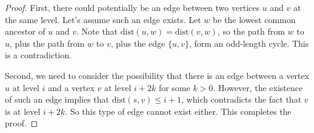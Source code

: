 \begin{flex}
\begin{proof}
First, there could potentially be an edge between two vertices $u$ and $v$ at the same level. Let's assume such an edge exists. Let $w$ be the lowest common ancestor of $u$ and $v$. Note that $\text{dist}(u,w) = \text{dist}(v,w)$, so the path from $w$ to $u$, plus the path from $w$ to $v$, plus the edge $\{u,v\}$, form an odd-length cycle. This is a contradiction. 

Second, we need to consider the possibility that there is an edge between a vertex $u$ at level $i$ and a vertex $v$ at level $i + 2k$ for some $k > 0$. However, the existence of such an edge implies that $\text{dist}(s,v) \leq i+1$, which contradicts the fact that $v$ is at level $i+2k$. So this type of edge cannot exist either. This completes the proof.

\end{proof}
\end{flex}

